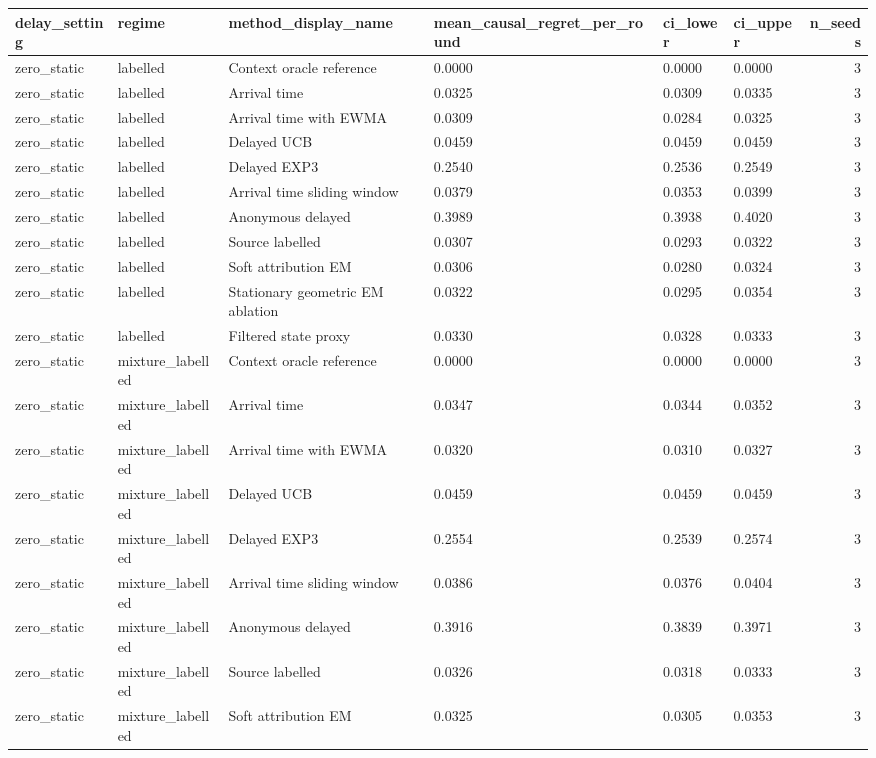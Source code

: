 \begin{tabular}{llllllr}
\toprule
delay\_setting & regime & method\_display\_name & mean\_causal\_regret\_per\_round & ci\_lower & ci\_upper & n\_seeds \\
\midrule
zero\_static & labelled & Context oracle reference & 0.0000 & 0.0000 & 0.0000 & 3 \\
zero\_static & labelled & Arrival time & 0.0325 & 0.0309 & 0.0335 & 3 \\
zero\_static & labelled & Arrival time with EWMA & 0.0309 & 0.0284 & 0.0325 & 3 \\
zero\_static & labelled & Delayed UCB & 0.0459 & 0.0459 & 0.0459 & 3 \\
zero\_static & labelled & Delayed EXP3 & 0.2540 & 0.2536 & 0.2549 & 3 \\
zero\_static & labelled & Arrival time sliding window & 0.0379 & 0.0353 & 0.0399 & 3 \\
zero\_static & labelled & Anonymous delayed & 0.3989 & 0.3938 & 0.4020 & 3 \\
zero\_static & labelled & Source labelled & 0.0307 & 0.0293 & 0.0322 & 3 \\
zero\_static & labelled & Soft attribution EM & 0.0306 & 0.0280 & 0.0324 & 3 \\
zero\_static & labelled & Stationary geometric EM ablation & 0.0322 & 0.0295 & 0.0354 & 3 \\
zero\_static & labelled & Filtered state proxy & 0.0330 & 0.0328 & 0.0333 & 3 \\
zero\_static & mixture\_labelled & Context oracle reference & 0.0000 & 0.0000 & 0.0000 & 3 \\
zero\_static & mixture\_labelled & Arrival time & 0.0347 & 0.0344 & 0.0352 & 3 \\
zero\_static & mixture\_labelled & Arrival time with EWMA & 0.0320 & 0.0310 & 0.0327 & 3 \\
zero\_static & mixture\_labelled & Delayed UCB & 0.0459 & 0.0459 & 0.0459 & 3 \\
zero\_static & mixture\_labelled & Delayed EXP3 & 0.2554 & 0.2539 & 0.2574 & 3 \\
zero\_static & mixture\_labelled & Arrival time sliding window & 0.0386 & 0.0376 & 0.0404 & 3 \\
zero\_static & mixture\_labelled & Anonymous delayed & 0.3916 & 0.3839 & 0.3971 & 3 \\
zero\_static & mixture\_labelled & Source labelled & 0.0326 & 0.0318 & 0.0333 & 3 \\
zero\_static & mixture\_labelled & Soft attribution EM & 0.0325 & 0.0305 & 0.0353 & 3 \\

\end{tabular}
